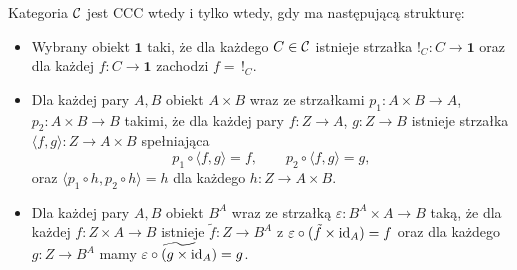 \begin{stwierdzenie}\label{stw:ccc-rown}
Kategoria $\mathcal{C}$ jest CCC wtedy i tylko wtedy, gdy ma następującą strukturę:
\begin{itemize}
\item Wybrany obiekt $\mathbf{1}$ taki, że dla każdego $C \in \mathcal{C}$ istnieje strzałka $!_C : C \to \mathbf{1}$ oraz dla każdej $f : C \to \mathbf{1}$ zachodzi $f = \,!_C$.

\item Dla każdej pary $A, B$ obiekt $A \times B$ wraz ze strzałkami $p_1 : A \times B \to A$, $p_2 : A \times B \to B$ takimi, że dla każdej pary $f : Z \to A$, $g : Z \to B$ istnieje strzałka $\langle f, g \rangle : Z \to A \times B$ spełniająca
\[
p_1 \circ \langle f, g \rangle = f, \qquad p_2 \circ \langle f, g \rangle = g,
\]
oraz $\langle p_1 \circ h, p_2 \circ h \rangle = h$ dla każdego $h : Z \to A \times B$.

\item Dla każdej pary $A, B$ obiekt $B^A$ wraz ze strzałką $\varepsilon : B^A \times A \to B$ taką, że dla każdej $f : Z \times A \to B$ istnieje $\tilde{f} : Z \to B^A$ z $\varepsilon \circ (\tilde{f} \times \mathrm{id}_A) = f$ oraz dla każdego $g : Z \to B^A$ mamy $\widetilde{\varepsilon \circ (g \times \mathrm{id}_A)} = g$.
\end{itemize}
\end{stwierdzenie}
